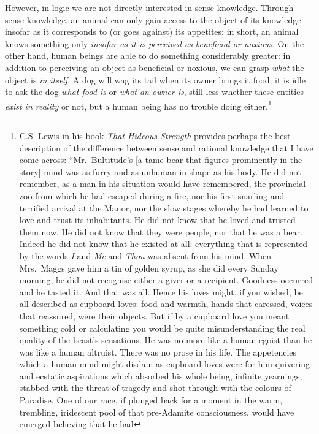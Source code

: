 \documentclass[
  12pt,
]{memoir}
\begin{document}
However, in logic we are not directly interested in sense knowledge.
Through sense knowledge, an animal can only gain access to the object of
its knowledge insofar as it corresponds to (or goes against) its
appetites: in short, an animal knows something only \emph{insofar as it
is perceived as beneficial or noxious}. On the other hand, human beings
are able to do something considerably greater: in addition to perceiving
an object as beneficial or noxious, we can grasp \emph{what} the object
is \emph{in itself}. A dog will wag its tail when its owner brings it
food; it is idle to ask the dog \emph{what food is} or \emph{what an
owner is}, still less whether these entities \emph{exist in reality} or
not, but a human being has no trouble doing either.\footnote{C.S. Lewis
  in his book \emph{That Hideous Strength} provides perhaps the best
  description of the difference between sense and rational knowledge
  that I have come across: ``Mr.~Bultitude's {[}a tame bear that figures
  prominently in the story{]} mind was as furry and as unhuman in shape
  as his body. He did not remember, as a man in his situation would have
  remembered, the provincial zoo from which he had escaped during a
  fire, nor his first snarling and terrified arrival at the Manor, nor
  the slow stages whereby he had learned to love and trust its
  inhabitants. He did not know that he loved and trusted them now. He
  did not know that they were people, nor that he was a bear. Indeed he
  did not know that he existed at all: everything that is represented by
  the words \emph{I} and \emph{Me} and \emph{Thou} was absent from his
  mind. When Mrs.~Maggs gave him a tin of golden syrup, as she did every
  Sunday morning, he did not recognise either a giver or a recipient.
  Goodness occurred and he tasted it. And that was all. Hence his loves
  might, if you wished, be all described as cupboard loves: food and
  warmth, hands that caressed, voices that reassured, were their
  objects. But if by a cupboard love you meant something cold or
  calculating you would be quite misunderstanding the real quality of
  the beast's sensations. He was no more like a human egoist than he was
  like a human altruist. There was no prose in his life. The appetencies
  which a human mind might disdain as cupboard loves were for him
  quivering and ecstatic aspirations which absorbed his whole being,
  infinite yearnings, stabbed with the threat of tragedy and shot
  through with the colours of Paradise. One of our race, if plunged back
  for a moment in the warm, trembling, iridescent pool of that
  pre-Adamite consciousness, would have emerged believing that he had
}
\end{document}
